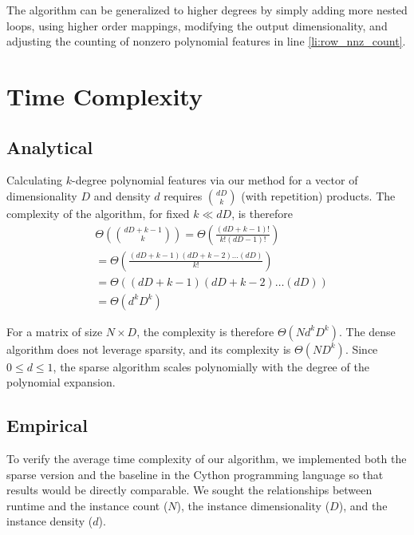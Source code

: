 \documentclass{article}
\begin{document}
The algorithm can be generalized to higher degrees by simply adding more nested loops, using higher order mappings, modifying the output dimensionality, and adjusting the counting of nonzero polynomial features in line \ref{li:row_nnz_count}.

\section{Time Complexity}
\subsection{Analytical}
\label{sec:analytical}

Calculating $k$-degree polynomial features via our method for a vector of dimensionality $D$ and density $d$ requires $\binom{dD}{k}$ (with repetition) products.
The complexity of the algorithm, for fixed $k \ll dD$, is therefore
\begin{align}
& \Theta\left(\binom{dD+k-1}{k}\right) = \Theta\left(\frac{(dD+k-1)!}{k!(dD-1)!}\right)\\
& = \Theta\left(\frac{(dD+k-1)(dD+k-2) \dots (dD)}{k!}\right)\\
& = \Theta\left((dD+k-1)(dD+k-2) \dots (dD)\right)\\
& = \Theta\left(d^kD^k\right)
\end{align}

For a matrix of size $N \times D$, the complexity is therefore $\Theta\left(Nd^kD^k\right)$.
The dense algorithm does not leverage sparsity, and its complexity is $\Theta\left(ND^k\right)$.
Since $0 \le d \le 1$, the sparse algorithm scales polynomially with the degree of the polynomial expansion.

\newpage

\subsection{Empirical}
To verify the average time complexity of our algorithm, we implemented both the sparse version and the baseline in the Cython programming language so that results would be directly comparable.
We sought the relationships between runtime and the instance count ($N$), the instance dimensionality ($D$), and the instance density ($d$).
\end{document}
